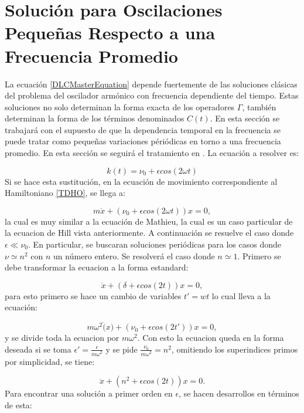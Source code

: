 \documentclass[a4paper,10pt]{report}
\begin{document}
\section{Solución para Oscilaciones Pequeñas Respecto a una Frecuencia Promedio}

La ecuación \ref{DLCMasterEquation} depende fuertemente de las soluciones clásicas del problema del oscilador armónico con frecuencia dependiente del tiempo. Estas soluciones no solo determinan la forma exacta de los operadores $\Gamma$, también determinan la forma de los términos denominados $C(t)$. En esta sección se trabajará con el supuesto de que la dependencia temporal en la frecuencia se puede tratar como pequeñas variaciones périódicas en torno a una frecuencia promedio. En esta sección se seguirá el tratamiento en \cite{WardFT}. La ecuación a resolver es: 

\begin{equation}
k(t) = \nu_0 + \epsilon cos(2\omega t)
\end{equation}Si se hace esta sustitución, en la ecuación de movimiento correspondiente al Hamiltoniano \ref{TDHO}, se llega a:

\begin{equation}
m\ddot{x} + (\nu_0 + \epsilon cos(2\omega t))x = 0,
\end{equation} la cual es muy similar a la ecuación de Mathieu, la cual es un caso particular de la ecuacion de Hill vista anteriormente. A continuación se resuelve el caso donde $\epsilon \ll \nu_0$. En particular, se buscaran soluciones periódicas para los casos donde $\nu \simeq n^2$ con $n$ un número entero. Se resolverá el caso donde $n \simeq 1$. Primero se debe transformar la ecuacion a la forma estandard:

\begin{equation}
\ddot{x} + (\delta+\epsilon cos(2t))x=0,
\end{equation} para esto primero se hace un cambio de variables $t' = wt$ lo cual lleva a la ecuación:

\begin{equation}
m\omega^2\ddot(x)+(\nu_0+\epsilon cos(2t'))x=0,
\end{equation} y se divide toda la ecuacion por $m\omega^2$. Con esto la ecuacion queda en la forma deseada si se toma $\epsilon' = \frac{\epsilon}{m\omega^2}$ y se pide $\frac{\nu_0}{m\omega^2} = n^2$, omitiendo los superindices primos por simplicidad, se tiene:

\begin{equation} \label{MathieuEquation}
\ddot{x} + (n^2+\epsilon cos(2t))x=0.
\end{equation} Para encontrar una solución a primer orden en $\epsilon$, se hacen desarrollos en términos de esta:
\end{document}
